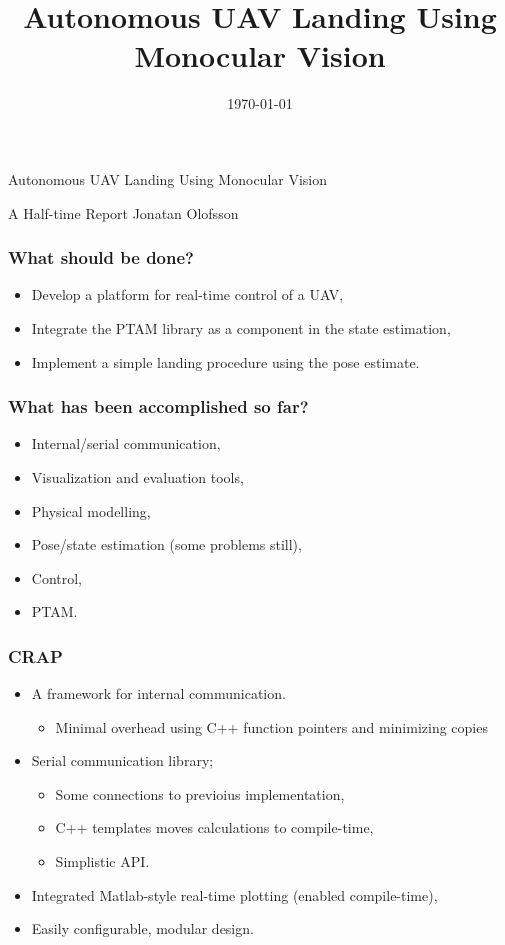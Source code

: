 \documentclass{beamer}
\title[A Half-time Report]{Autonomous UAV Landing Using Monocular Vision}
\date{\today}
\begin{document}
\begin{frame}

\Huge Autonomous UAV Landing Using Monocular Vision

\LARGE A Half-time Report
\newline
\newline
Jonatan Olofsson

\end{frame}

\begin{frame}
    \frametitle{What should be done?}
    \begin{itemize}
        \item Develop a platform for real-time control of a UAV,
        \item Integrate the PTAM library as a component in the state estimation,
        \item Implement a simple landing procedure using the pose estimate.
    \end{itemize}

\end{frame}


\begin{frame}
    \frametitle{What has been accomplished so far?}
    \begin{itemize}
        \item Internal/serial communication,
        \item Visualization and evaluation tools,
        \item Physical modelling,
        \item Pose/state estimation (some problems still),
        \item Control,
        \item PTAM.
    \end{itemize}
\end{frame}


\begin{frame}
    \frametitle{CRAP}
    \begin{itemize}
        \item A framework for internal communication.
        \begin{itemize}
            \item Minimal overhead using C++ function pointers and minimizing copies
        \end{itemize}
        \item Serial communication library;
        \begin{itemize}
            \item Some connections to previoius implementation,
            \item C++ templates moves calculations to compile-time,
            \item Simplistic API.
        \end{itemize}
        \item Integrated Matlab-style real-time plotting (enabled compile-time),
        \item Easily configurable, modular design.
    \end{itemize}
\end{frame}
\end{document}
